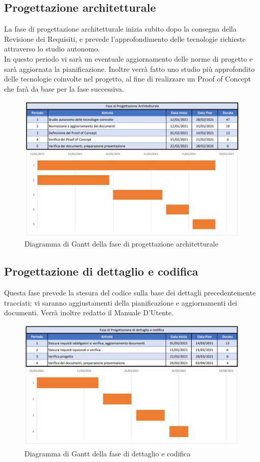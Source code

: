 \documentclass[../piano_di_progetto.tex]{subfiles}
\begin{document}
\subsection{Progettazione architetturale}%
\label{sub:prog_arc}
La fase di progettazione architetturale inizia subito dopo la consegna della Revisione dei Requisiti, e prevede l’approfondimento delle tecnologie richieste attraverso lo studio autonomo. \\
In questo periodo vi sarà un eventuale aggiornamento delle norme di progetto e sarà aggiornata la pianificazione. Inoltre verrà fatto uno studio più approfondito delle tecnologie coinvolte nel progetto, al fine di realizzare un Proof of Concept che farà da base per la fase successiva.

\begin{figure}[H]
\centering
\includegraphics[width=12cm]{componenti/fase_prog_archit}
\caption{Diagramma di Gantt della fase di progettazione architetturale}
\end{figure}


\subsection{Progettazione di dettaglio e codifica}%
\label{sub:prog_dett}
Questa fase prevede la stesura del codice sulla base dei dettagli precedentemente tracciati; vi saranno aggiustamenti della pianificazione e aggiornamenti dei documenti. Verrà inoltre redatto il Manuale D’Utente.

\begin{figure}[H]
\centering
\includegraphics[width=12cm]{componenti/fase_dett_cod}
\caption{Diagramma di Gantt della fase di dettaglio e codifica}
\end{figure}
\end{document}
